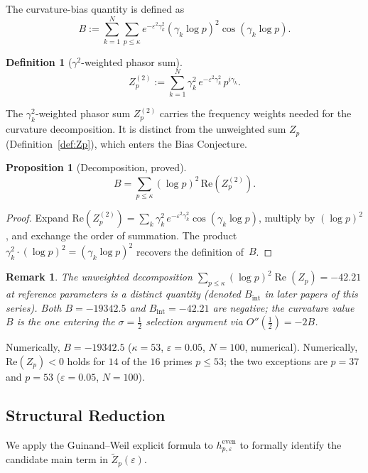 \documentclass[11pt]{article}
\newtheorem{proposition}[theorem]{Proposition}
\newtheorem{definition}[theorem]{Definition}
\newtheorem*{remark}{Remark}
\newcommand{\Zt}{\widetilde{Z}}
\begin{document}
The curvature-bias quantity is defined as
\[
B := \sum_{k=1}^N\sum_{p\leq\kappa}
     e^{-\varepsilon^2\gamma_k^2}(\gamma_k\log p)^2\cos(\gamma_k\log p).
\]

\begin{definition}[$\gamma^2$-weighted phasor sum]
\label{def:Zp2}
\[
Z_p^{(2)} := \sum_{k=1}^N \gamma_k^2\,
             e^{-\varepsilon^2\gamma_k^2}\,p^{i\gamma_k}.
\]
\end{definition}

\noindent
The $\gamma_k^2$-weighted phasor sum $Z_p^{(2)}$ carries the
frequency weights needed for the curvature decomposition.
It is distinct from the unweighted sum $Z_p$
(Definition~\ref{def:Zp}), which enters the Bias Conjecture.

\begin{proposition}[Decomposition, proved]
\label{prop:decomp}
\[
B = \sum_{p\leq\kappa}(\log p)^2\,\mathrm{Re}(Z_p^{(2)}).
\]
\end{proposition}

\begin{proof}
Expand $\mathrm{Re}(Z_p^{(2)})
= \sum_k \gamma_k^2\,e^{-\varepsilon^2\gamma_k^2}\cos(\gamma_k\log p)$,
multiply by $(\log p)^2$, and exchange the order of summation.
The product $\gamma_k^2\cdot(\log p)^2 = (\gamma_k\log p)^2$
recovers the definition of~$B$.
\end{proof}

\begin{remark}
The unweighted decomposition
$\sum_{p\leq\kappa}(\log p)^2\operatorname{Re}(Z_p) = -42.21$
at reference parameters is a distinct quantity (denoted
$B_{\mathrm{int}}$ in later papers of this series).
Both $B=-19342.5$ and $B_{\mathrm{int}}=-42.21$ are negative;
the curvature value~$B$ is the one entering the
$\sigma=\tfrac{1}{2}$ selection argument via
$O''(\tfrac12)=-2B$.
\end{remark}

Numerically, $B=-19342.5$ ($\kappa=53$, $\varepsilon=0.05$,
$N=100$, numerical).
Numerically, $\mathrm{Re}(Z_p)<0$ holds for $14$ of the $16$ primes
$p\leq 53$; the two exceptions are $p=37$ and $p=53$
($\varepsilon=0.05$, $N=100$).

\subsection{Structural Reduction}
\label{ssec:reduction}

We apply the Guinand--Weil explicit formula to $h^{\mathrm{even}}_{p,\varepsilon}$
to formally identify the candidate main term in $\Zt_p(\varepsilon)$.
\end{document}
